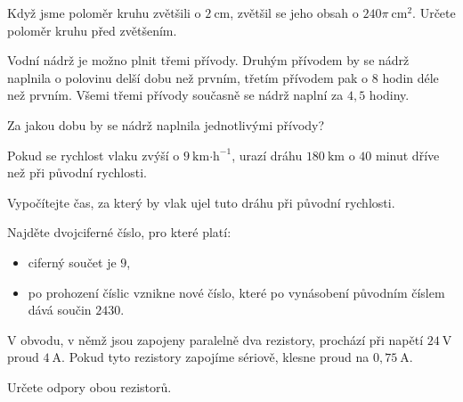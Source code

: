 \documentclass[12pt,a4paper]{article}
\begin{document}
\begin{exercise}
Když jsme poloměr kruhu zvětšili o \(2\ \text{cm}\), zvětšil se jeho obsah o
$
240\pi\ \text{cm}^2.
$
Určete poloměr kruhu před zvětšením.

\end{exercise}


\begin{exercise}
Vodní nádrž je možno plnit třemi přívody. Druhým přívodem by se nádrž naplnila
o polovinu delší dobu než prvním, třetím přívodem pak o \(8\) hodin déle než prvním.
Všemi třemi přívody současně se nádrž naplní za \(4{,}5\) hodiny.

Za jakou dobu by se nádrž naplnila jednotlivými přívody?

\end{exercise}


\begin{exercise}
Pokud se rychlost vlaku zvýší o \(9\ \text{km·h}^{-1}\), urazí dráhu \(180\ \text{km}\)
o \(40\) minut dříve než při původní rychlosti.

Vypočítejte čas, za který by vlak ujel tuto dráhu při původní rychlosti.

\end{exercise}


\begin{exercise}
Najděte dvojciferné číslo, pro které platí:

\begin{itemize}
  \item ciferný součet je \(9\),
  \item po prohození číslic vznikne nové číslo, které po vynásobení původním číslem
        dává součin \(2430\).
\end{itemize}

\end{exercise}


\begin{exercise}
V obvodu, v němž jsou zapojeny paralelně dva rezistory, prochází při napětí 
\(24\ \text{V}\) proud \(4\ \text{A}\).  
Pokud tyto rezistory zapojíme sériově, klesne proud na \(0{,}75\ \text{A}\).

Určete odpory obou rezistorů.

\end{exercise}
\end{document}
